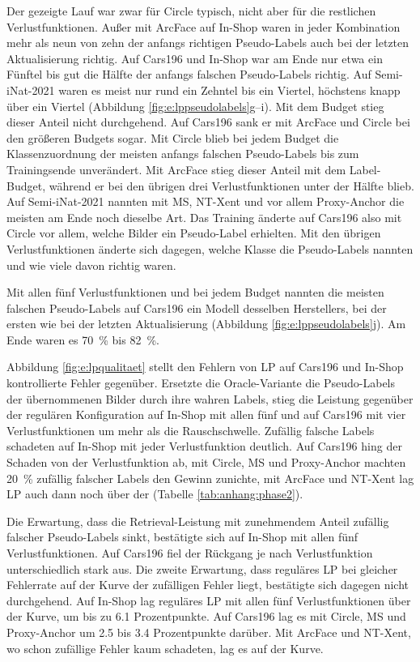 Der gezeigte Lauf war zwar für Circle typisch, nicht aber für die restlichen Verlustfunktionen. Außer mit ArcFace auf In-Shop waren in jeder Kombination mehr als neun von zehn der anfangs richtigen Pseudo-Labels auch bei der letzten Aktualisierung richtig. Auf Cars196 und In-Shop war am Ende nur etwa ein Fünftel bis gut die Hälfte der anfangs falschen Pseudo-Labels richtig. Auf Semi-iNat-2021 waren es meist nur rund ein Zehntel bis ein Viertel, höchstens knapp über ein Viertel (Abbildung \ref{fig:e:lppseudolabels}g--i). Mit dem Budget stieg dieser Anteil nicht durchgehend. Auf Cars196 sank er mit ArcFace und Circle bei den größeren Budgets sogar. Mit Circle blieb bei jedem Budget die Klassenzuordnung der meisten anfangs falschen Pseudo-Labels bis zum Trainingsende unverändert. Mit ArcFace stieg dieser Anteil mit dem Label-Budget, während er bei den übrigen drei Verlustfunktionen unter der Hälfte blieb. Auf Semi-iNat-2021 nannten mit \ac{MS}, \ac{NT-Xent} und vor allem Proxy-Anchor die meisten am Ende noch dieselbe Art. Das Training änderte auf Cars196 also mit Circle vor allem, welche Bilder ein Pseudo-Label erhielten. Mit den übrigen Verlustfunktionen änderte sich dagegen, welche Klasse die Pseudo-Labels nannten und wie viele davon richtig waren.

Mit allen fünf Verlustfunktionen und bei jedem Budget nannten die meisten falschen Pseudo-Labels auf Cars196 ein Modell desselben Herstellers, bei der ersten wie bei der letzten Aktualisierung (Abbildung \ref{fig:e:lppseudolabels}j). Am Ende waren es \qty{70}{\percent} bis \qty{82}{\percent}.

Abbildung \ref{fig:e:lpqualitaet} stellt den Fehlern von \ac{LP} auf Cars196 und In-Shop kontrollierte Fehler gegenüber. Ersetzte die Oracle-Variante die Pseudo-Labels der übernommenen Bilder durch ihre wahren Labels, stieg die Leistung gegenüber der regulären Konfiguration auf In-Shop mit allen fünf und auf Cars196 mit vier Verlustfunktionen um mehr als die Rauschschwelle. Zufällig falsche Labels schadeten auf In-Shop mit jeder Verlustfunktion deutlich. Auf Cars196 hing der Schaden von der Verlustfunktion ab, mit Circle, \ac{MS} und Proxy-Anchor machten \qty{20}{\percent} zufällig falscher Labels den Gewinn zunichte, mit ArcFace und \ac{NT-Xent} lag \ac{LP} auch dann noch über der \UEBL (Tabelle \ref{tab:anhang:phase2}).

Die Erwartung, dass die Retrieval-Leistung mit zunehmendem Anteil zufällig falscher Pseudo-Labels sinkt, bestätigte sich auf In-Shop mit allen fünf Verlustfunktionen. Auf Cars196 fiel der Rückgang je nach Verlustfunktion unterschiedlich stark aus. Die zweite Erwartung, dass reguläres \ac{LP} bei gleicher Fehlerrate auf der Kurve der zufälligen Fehler liegt, bestätigte sich dagegen nicht durchgehend. Auf In-Shop lag reguläres \ac{LP} mit allen fünf Verlustfunktionen über der Kurve, um bis zu \num{6.1} Prozentpunkte. Auf Cars196 lag es mit Circle, \ac{MS} und Proxy-Anchor um \num{2.5} bis \num{3.4} Prozentpunkte darüber. Mit ArcFace und \ac{NT-Xent}, wo schon zufällige Fehler kaum schadeten, lag es auf der Kurve.

